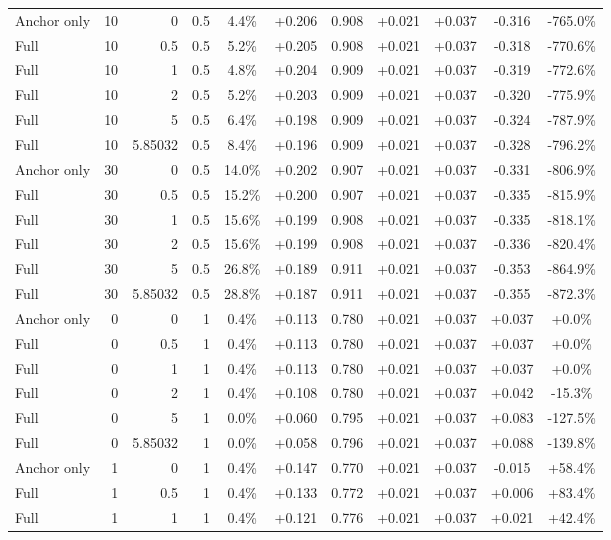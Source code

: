 \begin{table}[htbp]
\begin{tabular}{lrrrccccccc}
Anchor only & 10 & 0 & 0.5 & 4.4\% & +0.206 & 0.908 & +0.021 & +0.037 & -0.316 & -765.0\% \\
Full & 10 & 0.5 & 0.5 & 5.2\% & +0.205 & 0.908 & +0.021 & +0.037 & -0.318 & -770.6\% \\
Full & 10 & 1 & 0.5 & 4.8\% & +0.204 & 0.909 & +0.021 & +0.037 & -0.319 & -772.6\% \\
Full & 10 & 2 & 0.5 & 5.2\% & +0.203 & 0.909 & +0.021 & +0.037 & -0.320 & -775.9\% \\
Full & 10 & 5 & 0.5 & 6.4\% & +0.198 & 0.909 & +0.021 & +0.037 & -0.324 & -787.9\% \\
Full & 10 & 5.85032 & 0.5 & 8.4\% & +0.196 & 0.909 & +0.021 & +0.037 & -0.328 & -796.2\% \\
Anchor only & 30 & 0 & 0.5 & 14.0\% & +0.202 & 0.907 & +0.021 & +0.037 & -0.331 & -806.9\% \\
Full & 30 & 0.5 & 0.5 & 15.2\% & +0.200 & 0.907 & +0.021 & +0.037 & -0.335 & -815.9\% \\
Full & 30 & 1 & 0.5 & 15.6\% & +0.199 & 0.908 & +0.021 & +0.037 & -0.335 & -818.1\% \\
Full & 30 & 2 & 0.5 & 15.6\% & +0.199 & 0.908 & +0.021 & +0.037 & -0.336 & -820.4\% \\
Full & 30 & 5 & 0.5 & 26.8\% & +0.189 & 0.911 & +0.021 & +0.037 & -0.353 & -864.9\% \\
Full & 30 & 5.85032 & 0.5 & 28.8\% & +0.187 & 0.911 & +0.021 & +0.037 & -0.355 & -872.3\% \\
Anchor only & 0 & 0 & 1 & 0.4\% & +0.113 & 0.780 & +0.021 & +0.037 & +0.037 & +0.0\% \\
Full & 0 & 0.5 & 1 & 0.4\% & +0.113 & 0.780 & +0.021 & +0.037 & +0.037 & +0.0\% \\
Full & 0 & 1 & 1 & 0.4\% & +0.113 & 0.780 & +0.021 & +0.037 & +0.037 & +0.0\% \\
Full & 0 & 2 & 1 & 0.4\% & +0.108 & 0.780 & +0.021 & +0.037 & +0.042 & -15.3\% \\
Full & 0 & 5 & 1 & 0.0\% & +0.060 & 0.795 & +0.021 & +0.037 & +0.083 & -127.5\% \\
Full & 0 & 5.85032 & 1 & 0.0\% & +0.058 & 0.796 & +0.021 & +0.037 & +0.088 & -139.8\% \\
Anchor only & 1 & 0 & 1 & 0.4\% & +0.147 & 0.770 & +0.021 & +0.037 & -0.015 & +58.4\% \\
Full & 1 & 0.5 & 1 & 0.4\% & +0.133 & 0.772 & +0.021 & +0.037 & +0.006 & +83.4\% \\
Full & 1 & 1 & 1 & 0.4\% & +0.121 & 0.776 & +0.021 & +0.037 & +0.021 & +42.4\% \\

\end{tabular}
\end{table}
